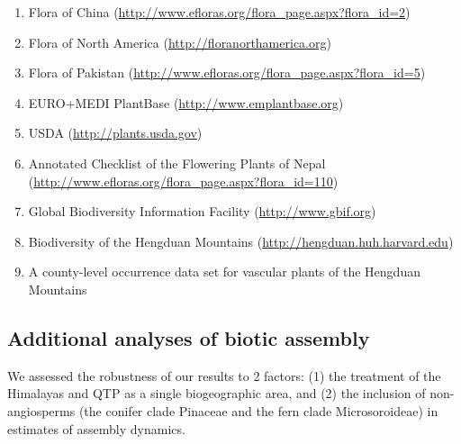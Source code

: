 \begin{enumerate}
\item Flora of China
  (\href{http://www.efloras.org/flora_page.aspx?flora_id=2}{http://www.efloras.org/flora\_page.aspx?flora\_id=2})
\item Flora of North
  America (\href{http://floranorthamerica.org}{http://floranorthamerica.org})
\item Flora of Pakistan
  (\href{http://www.efloras.org/flora\_page.aspx?flora\_id=5}{http://www.efloras.org/flora\_page.aspx?flora\_id=5})
\item EURO+MEDI PlantBase
  (\href{http://www.emplantbase.org}{http://www.emplantbase.org})
\item USDA (\href{http://plants.usda.gov}{http://plants.usda.gov})
\item Annotated Checklist of the Flowering Plants of Nepal
  (\href{http://www.efloras.org/flora\_page.aspx?flora\_id=110}{http://www.efloras.org/flora\_page.aspx?flora\_id=110})
\item Global Biodiversity Information Facility
  (\href{http://www.gbif.org}{http://www.gbif.org})
\item Biodiversity of the Hengduan Mountains
  (\href{http://hengduan.huh.harvard.edu}{http://hengduan.huh.harvard.edu})
\item A county-level occurrence data set for vascular plants of the
  Hengduan Mountains \citep{Zhang2009,Wu2008}
\end{enumerate}

\subsection*{Additional analyses of biotic assembly}

We assessed the robustness of our results to 2 factors: (1) the
treatment of the Himalayas and QTP as a single biogeographic area, and
(2) the inclusion of non-angiosperms (the conifer clade Pinaceae and
the fern clade Microsoroideae) in estimates of assembly dynamics.

